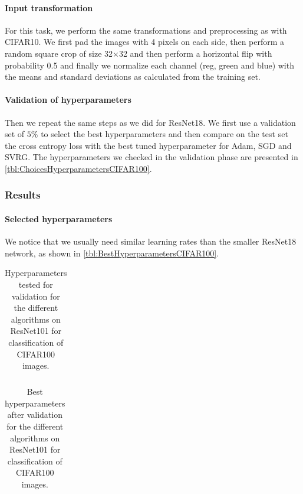 \documentclass[a4paper,11pt,oneside]{report}
\begin{document}
\paragraph{Input transformation}
For this task, we perform the same transformations and preprocessing as with CIFAR10. We first pad the images with 4 pixels on each side, then perform a random square crop of size 32×32 and then perform a horizontal flip with probability 0.5 and finally we normalize each channel (reg, green and blue) with the means and standard deviations as calculated from the training set. 
\paragraph{Validation of hyperparameters}
Then we repeat the same steps as we did for ResNet18. We first use a validation set of $5\%$ to select the best hyperparameters and then compare on the test set the cross entropy loss with the best tuned hyperparameter for Adam, SGD and SVRG. The hyperparameters we checked in the validation phase are presented in \autoref{tbl:ChoicesHyperparametersCIFAR100}. 

\subsubsection{Results}
\paragraph{Selected hyperparameters}
We notice that we usually need similar learning rates than the smaller ResNet18 network, as shown in \autoref{tbl:BestHyperparametersCIFAR100}.

\begin{table}
    \begin{center}
        \begin{tabular}{||c | c | l||}
             \hline
             
        \end{tabular}
    \end{center}
    \caption{Hyperparameters tested for validation for the different algorithms on ResNet101 for classification of CIFAR100 images.
    }
    \label{tbl:ChoicesHyperparametersCIFAR100}
\end{table}

\begin{table}
    \begin{center}
        \begin{tabular}{||c | c | l||}
             \hline
             
        \end{tabular}
    \end{center}
    \caption{Best hyperparameters after validation for the different algorithms on ResNet101 for classification of CIFAR100 images.
    }
    \label{tbl:BestHyperparametersCIFAR100}
\end{table}
\end{document}
